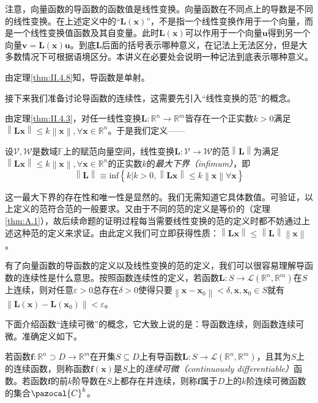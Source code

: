 \documentclass[main.tex]{subfiles}
\begin{document}
注意，向量函数的导函数的函数值是线性变换。向量函数在不同点上的导数是不同的线性变换。在上述定义中的“$\mathbf{L}\left(\mathbf{x}\right)$”，不是指一个线性变换作用于一个向量，而是一个线性变换值函数及其自变量。此时$\mathbf{L}\left(\mathbf{x}\right)$可以作用于一个向量$\mathbf{u}$得到另一个向量$\mathbf{v}=\mathbf{L}\left(\mathbf{x}\right)\mathbf{u}$。到底$\mathbf{L}$后面的括号表示哪种意义，在记法上无法区分，但是大多数情况下可根据语境区分。本讲义在必要处会说明一种记法到底表示哪种意义。

由定理\ref{thm:II.4.8}知，导函数是单射。

接下来我们准备讨论导函数的连续性，这需要先引入“线性变换的范”的概念。

由定理\ref{thm:II.4.3}，对任一线性变换$\mathbf{L}:\mathbb{R}^n\rightarrow\mathbb{R}^m$皆存在一个正实数$k>0$满足$\left\|\mathbf{Lx}\right\|\leq k\left\|\mathbf{x}\right\|,\forall\mathbf{x}\in\mathbb{R}^n$。于是我们定义——
\begin{definition}[线性变换的范]\label{def:II.4.16}
    设$\mathcal{V},\mathcal{W}$是数域$\mathbb{F}$上的赋范向量空间，线性变换$\mathbf{L}:\mathcal{V}\rightarrow\mathcal{W}$的范$\left\|\mathbf{L}\right\|$为满足$\left\|\mathbf{Lx}\right\|\leq k\left\|\mathbf{x}\right\|,\forall\mathbf{x}\in\mathbb{R}^n$的正实数$k$的\emph{最大下界（infimum）}，即
    \[\left\|\mathbf{L}\right\|\equiv\mathrm{inf}\left\{k|k>0,\left\|\mathbf{Lx}\right\|\leq k\left\|\mathbf{x}\right\|\forall\mathbf{x}\right\}\]
\end{definition}

这一最大下界的存在性和唯一性是显然的。我们无需知道它具体数值。可验证，以上定义的范符合范的一般要求。又由于不同的范的定义是等价的（定理\ref{thm:A.1}），故后续命题的证明过程每当需要线性变换的范的定义时都不妨通过上述这种范的定义来求证。由此定义我们可立即获得性质：$\left\|\mathbf{Lx}\right\|\leq\left\|\mathbf{L}\right\|\left\|\mathbf{x}\right\|$。

有了向量函数的导函数的定义以及线性变换的范的定义，我们可以很容易理解导函数的连续性是什么意思。按照函数连续性的定义，若函数$\mathbf{L}:S\rightarrow\mathcal{L}\left(\mathbb{R}^n,\mathbb{R}^m\right)$在$S$上连续，则对任意$\varepsilon>0$总存在$\delta>0$使得只要$\left\|\mathbf{x}-\mathbf{x}_0\right\|<\delta,\mathbf{x},\mathbf{x}_0\in S$就有$\left\|\mathbf{L}\left(\mathbf{x}\right)-\mathbf{L}\left(\mathbf{x}_0\right)\right\|<\varepsilon$。

下面介绍函数“连续可微”的概念，它大致上说的是：导函数连续，则函数连续可微。准确定义如下。

\begin{definition}[连续可微函数]\label{def:II.4.17}
    若函数$\mathbf{f}:\mathbb{R}^n\supset D\rightarrow\mathbb{R}^m$在开集$S\subseteq D$上有导函数$\mathbf{L}:S\rightarrow\mathcal{L}\left(\mathbb{R}^n,\mathbb{R}^m\right)$，且其为$S$上的连续函数，则称函数$\mathbf{f}\left(\mathbf{x}\right)$是$S$上的\emph{连续可微（continuously differentiable）}函数。若函数$\mathbf{f}$的前$k$阶导数在$S$上都存在并连续，则称$\mathbf{f}$属于$D$上的$k$阶连续可微函数的集合$\pazocal{C}^k$。
\end{definition}
\end{document}
